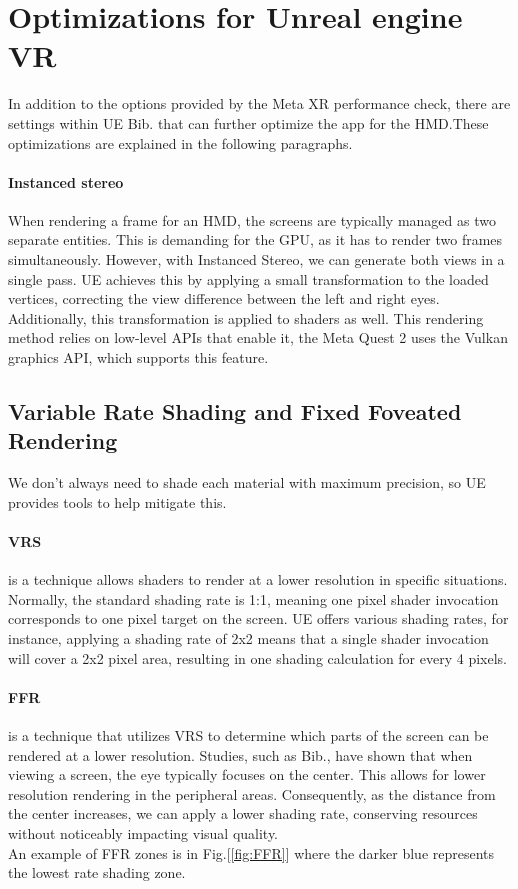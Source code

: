\section{Optimizations for Unreal engine VR}
\noindent
In addition to the options provided by the Meta XR performance check, there are settings within \ac{UE} Bib.\cite{UEperformance} that can further optimize the app for the \ac{HMD}.These optimizations are explained in the following paragraphs.

\paragraph{Instanced stereo}
When rendering a frame for an \ac{HMD}, the screens are typically managed as two separate entities. This is demanding for the GPU, as it has to render two frames simultaneously.
However, with Instanced Stereo, we can generate both views in a single pass. \ac{UE} achieves this by applying a small transformation to the loaded vertices, correcting the view difference between the left and right eyes. Additionally, this transformation is applied to shaders as well.
This rendering method relies on low-level \ac{API}s that enable it, the Meta Quest 2 uses the Vulkan graphics \ac{API}, which supports this feature.

\subsection{Variable Rate Shading and Fixed Foveated Rendering}
\noindent
We don't always need to shade each material with maximum precision, so \ac{UE} provides tools to help mitigate this.

\paragraph{\ac{VRS}}
is a technique allows shaders to render at a lower resolution in specific situations.
Normally, the standard shading rate is 1:1, meaning one pixel shader invocation corresponds to one pixel target on the screen.
\ac{UE} offers various shading rates, for instance, applying a shading rate of 2x2 means that a single shader invocation will cover a 2x2 pixel area, resulting in one shading calculation for every 4 pixels.

\paragraph{\ac{FFR}}
is a technique that utilizes \ac{VRS} to determine which parts of the screen can be rendered at a lower resolution.
Studies, such as Bib.\cite{eye}, have shown that when viewing a screen, the eye typically focuses on the center.
This allows for lower resolution rendering in the peripheral areas. Consequently, as the distance from the center increases, we can apply a lower shading rate, conserving resources without noticeably impacting visual quality.\\
An example of \ac{FFR} zones is in Fig.[\ref{fig:FFR}] where the darker blue represents the lowest rate shading zone.


